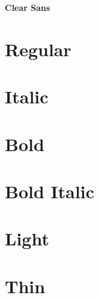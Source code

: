 \documentclass{article}
\begin{document}
\begin{center}\huge\bf Clear Sans
\end{center}


\section*{Regular}
\lipsum[1]

\section*{Italic}
\textit{\lipsum[2]}

\section*{Bold}

\textbf{\lipsum[3]}

\section*{Bold Italic}

\textbf{\textit{\lipsum[4]}}

\section*{Light}

\textsfl{\lipsum[5]}

\section*{Thin}

\textsft{\lipsum[6]}
\end{document}

